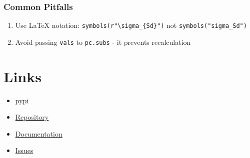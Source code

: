 \documentclass[
  letterpaper,
  DIV=11,
  numbers=noendperiod,
  fleqn]{scrartcl}
\providecommand{\tightlist}{%
  \setlength{\itemsep}{0pt}\setlength{\parskip}{0pt}}
\begin{document}
\subsubsection{Common Pitfalls}\label{common-pitfalls-1}

\begin{tcolorbox}[enhanced jigsaw, colback=white, toprule=.15mm, coltitle=black, arc=.35mm, opacitybacktitle=0.6, rightrule=.15mm, opacityback=0, leftrule=.75mm, titlerule=0mm, colbacktitle=quarto-callout-warning-color!10!white, left=2mm, bottomtitle=1mm, breakable, toptitle=1mm, title=\textcolor{quarto-callout-warning-color}{\faExclamationTriangle}\hspace{0.5em}{Warning}, bottomrule=.15mm, colframe=quarto-callout-warning-color-frame]

\begin{enumerate}
\def\labelenumi{\arabic{enumi}.}
\tightlist
\item
  Use LaTeX notation: \texttt{symbols(r"\textbackslash{}sigma\_\{Sd\}")}
  not \texttt{symbols("sigma\_Sd")}
\item
  Avoid passing \texttt{vals} to \texttt{pc.subs} - it prevents
  recalculation
\end{enumerate}

\end{tcolorbox}

\section{Links}\label{links}

\begin{itemize}
\tightlist
\item
  \href{\%22https://pypi.org/project/keecas/\%22}{pypi}
\item
  \href{\%22https://github.com/kompre/keecas\%22}{Repository}
\item
  \href{\%22https://kompre.github.io/keecas\%22}{Documentation}
\item
  \href{\%22https://github.com/kompre/keecas/issues\%22}{Issues}
\end{itemize}
\end{document}
